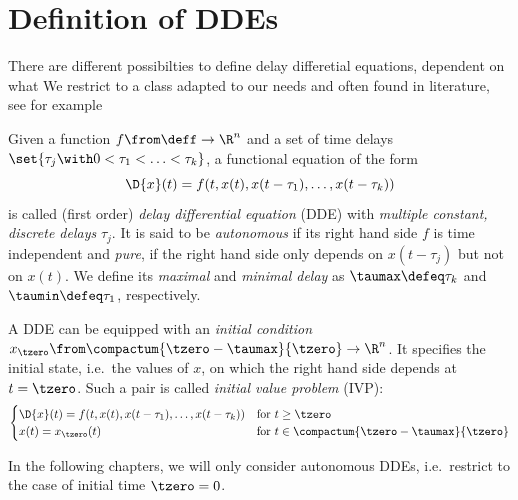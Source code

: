 \section{Definition of DDEs}
    \label{sec:definition-dde}

    There are different possibilties to define delay differetial equations, dependent on what 
    We restrict to a class adapted to our needs and often found in literature,  see for example \cite{Roussel04DDEs}

    \begin{definition}\label{def:dde}
        Given a function $f\from\deff\to\R^n$ and a set of time delays $\set{\tau_j\with 0<\tau_1<\ldots<\tau_k}$, a functional equation of the form
        \begin{equation}\label{eq:dde}
            \D{x}(t) = f(t,x(t),x(t-\tau_1),\ldots,x(t-\tau_k))
        \end{equation}
        is called (first order) \emph{delay differential equation} (DDE) with \emph{multiple constant, discrete delays} $\tau_j$.
        It is said to be \emph{autonomous} if its right hand side $f$ is time independent and \emph{pure}, if the right hand side only depends on $x(t-\tau_j)$ but not on $x(t)$.
        We define its \emph{maximal} and \emph{minimal delay} as $\taumax\defeq\tau_k$ and $\taumin\defeq\tau_1$, respectively.

        A DDE can be equipped with an \emph{initial condition} $x_{\tzero}\from \compactum{\tzero-\taumax}{\tzero} \to\R^n$. It specifies the initial state, i.e.\ the values of $x$, on which the right hand side depends at $t=\tzero$.
        Such a pair is called \emph{initial value problem} (IVP):
        \begin{equation}\label{eq:ivp}
            \begin{cases}
                \D{x}(t) = f(t,x(t),x(t-\tau_1),\ldots,x(t-\tau_k)) & \text{for } t\geq\tzero\\
                x(t) = x_{\tzero}(t) & \text{for } t\in\compactum{\tzero-\taumax}{\tzero}
            \end{cases}
        \end{equation}
    \end{definition}


    In the following chapters, we will only consider autonomous DDEs, i.e.\ restrict to the case of initial time $\tzero=0$.

